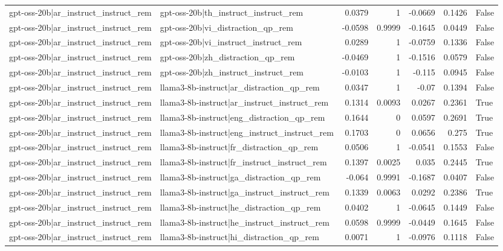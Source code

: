 \begin{table}
\begin{tabular}{l l r r r r l}
gpt-oss-20b|ar_instruct_instruct_rem & gpt-oss-20b|th_instruct_instruct_rem & 0.0379 & 1 & -0.0669 & 0.1426 & False \\
gpt-oss-20b|ar_instruct_instruct_rem & gpt-oss-20b|vi_distraction_qp_rem & -0.0598 & 0.9999 & -0.1645 & 0.0449 & False \\
gpt-oss-20b|ar_instruct_instruct_rem & gpt-oss-20b|vi_instruct_instruct_rem & 0.0289 & 1 & -0.0759 & 0.1336 & False \\
gpt-oss-20b|ar_instruct_instruct_rem & gpt-oss-20b|zh_distraction_qp_rem & -0.0469 & 1 & -0.1516 & 0.0579 & False \\
gpt-oss-20b|ar_instruct_instruct_rem & gpt-oss-20b|zh_instruct_instruct_rem & -0.0103 & 1 & -0.115 & 0.0945 & False \\
gpt-oss-20b|ar_instruct_instruct_rem & llama3-8b-instruct|ar_distraction_qp_rem & 0.0347 & 1 & -0.07 & 0.1394 & False \\
gpt-oss-20b|ar_instruct_instruct_rem & llama3-8b-instruct|ar_instruct_instruct_rem & 0.1314 & 0.0093 & 0.0267 & 0.2361 & True \\
gpt-oss-20b|ar_instruct_instruct_rem & llama3-8b-instruct|eng_distraction_qp_rem & 0.1644 & 0 & 0.0597 & 0.2691 & True \\
gpt-oss-20b|ar_instruct_instruct_rem & llama3-8b-instruct|eng_instruct_instruct_rem & 0.1703 & 0 & 0.0656 & 0.275 & True \\
gpt-oss-20b|ar_instruct_instruct_rem & llama3-8b-instruct|fr_distraction_qp_rem & 0.0506 & 1 & -0.0541 & 0.1553 & False \\
gpt-oss-20b|ar_instruct_instruct_rem & llama3-8b-instruct|fr_instruct_instruct_rem & 0.1397 & 0.0025 & 0.035 & 0.2445 & True \\
gpt-oss-20b|ar_instruct_instruct_rem & llama3-8b-instruct|ga_distraction_qp_rem & -0.064 & 0.9991 & -0.1687 & 0.0407 & False \\
gpt-oss-20b|ar_instruct_instruct_rem & llama3-8b-instruct|ga_instruct_instruct_rem & 0.1339 & 0.0063 & 0.0292 & 0.2386 & True \\
gpt-oss-20b|ar_instruct_instruct_rem & llama3-8b-instruct|he_distraction_qp_rem & 0.0402 & 1 & -0.0645 & 0.1449 & False \\
gpt-oss-20b|ar_instruct_instruct_rem & llama3-8b-instruct|he_instruct_instruct_rem & 0.0598 & 0.9999 & -0.0449 & 0.1645 & False \\
gpt-oss-20b|ar_instruct_instruct_rem & llama3-8b-instruct|hi_distraction_qp_rem & 0.0071 & 1 & -0.0976 & 0.1118 & False \\

\end{tabular}
\end{table}
